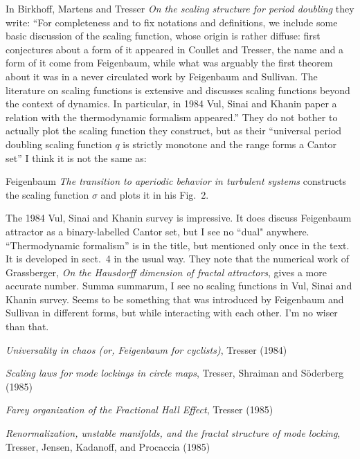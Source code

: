 \begin{description}
In Birkhoff, Martens and Tresser
{\em On the scaling structure for period doubling} they write:
``For  completeness  and  to fix notations  and  definitions,  we include
some  basic discussion  of the scaling function,  whose origin is rather
diffuse:  first  conjectures  about a form  of it  appeared  in Coullet
and Tresser, the name and a  form  of it  come from
Feigenbaum, while what  was  arguably the first theorem
about  it was in a never circulated  work by Feigenbaum  and  Sullivan.
The literature  on  scaling functions  is  extensive  and  discusses
scaling functions  beyond  the context  of dynamics.  In  particular,  in
1984 Vul, Sinai and Khanin paper  a  relation  with  the
thermodynamic  formalism  appeared.''
They do not bother to actually plot the scaling function they construct,
but as their ``universal period doubling scaling function $q$ is strictly
monotone and the range forms a Cantor set'' I think it is not the same
as:

Feigenbaum {\em The transition to aperiodic behavior in
turbulent systems} constructs the scaling function $\sigma$ and plots it in
his Fig.~2.

The 1984 Vul, Sinai and Khanin survey is impressive. It does
discuss Feigenbaum attractor as a binary-labelled Cantor set, but I see
no ``dual" anywhere. ``Thermodynamic formalism'' is in the title, but
mentioned only once in the text. It is developed in sect.~4 in the usual
way. They note that the numerical work of Grassberger,
{\em On the {Hausdorff} dimension of fractal attractors}, gives a more
accurate number. Summa summarum, I see no scaling functions in Vul, Sinai
and Khanin survey. Seems to be something that was introduced
by Feigenbaum and Sullivan in different forms, but while interacting with
each other. I'm no wiser than that.

\end{description}

{\em Universality in chaos (or, {Feigenbaum} for cyclists)},
{Tresser}
{(1984)}

{\em Scaling laws for mode lockings in circle maps},
{Tresser, Shraiman and S\"oderberg}
{(1985)}

{\em Farey organization of the {Fractional Hall Effect}},
{Tresser}
{(1985)}

{\em Renormalization, unstable manifolds, and the fractal structure of
mode locking},
{Tresser,  Jensen, Kadanoff, and Procaccia}
{(1985)}

